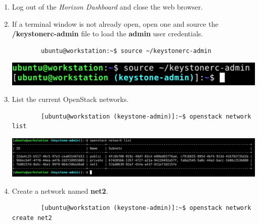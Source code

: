 \documentclass[letterpaper, 12pt]{article}
\begin{document}
\begin{enumerate}
    \item Log out of the \textit{Horizon Dashboard} and close the web browser.

    \item If a terminal window is not already open, open one and source the \textbf{\texttildemid/keystonerc-admin} file to load the \textbf{admin} user credentials.
    \begin{lstlisting}
        ubuntu@workstation:~$ source ~/keystonerc-admin
    \end{lstlisting}

    \begin{center}
        \includegraphics[width=\linewidth]{images/part3/step12.png}
    \end{center}

    \item List the current OpenStack networks.
    \begin{lstlisting}
        [ubuntu@workstation (keystone-admin)]:~$ openstack network list
    \end{lstlisting}

    \begin{center}
        \includegraphics[width=\linewidth]{images/part3/step13.png}
    \end{center}

    \item Create a network named \textbf{net2}.
    \begin{lstlisting}
        [ubuntu@workstation (keystone-admin)]:~$ openstack network create net2
    \end{lstlisting}


\end{enumerate}
\end{document}
